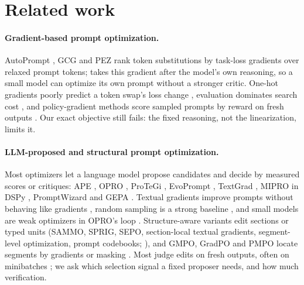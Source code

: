 \section{Related work}
\label{sec:related}

\paragraph{Gradient-based prompt optimization.} AutoPrompt \citep{shin2020autoprompt}, GCG
\citep{zou2023gcg} and PEZ \citep{wen2023hard} rank token substitutions by task-loss gradients
over relaxed prompt tokens; \greater{} \citep{das2025greater} takes this gradient after the model's
own reasoning, so a small model can optimize its own prompt without a stronger critic. One-hot
gradients poorly predict a token swap's loss change \citep{li2024fastergcg}, evaluation dominates
search cost \citep{zhao2024probe}, and policy-gradient methods score sampled prompts by reward on
fresh outputs \citep{deng2022rlprompt,diao2023bdpl}. Our exact objective still fails: the fixed
reasoning, not the linearization, limits it.

\paragraph{LLM-proposed and structural prompt optimization.} Most optimizers let a language model
propose candidates and decide by measured scores or critiques: APE \citep{zhou2023ape}, OPRO
\citep{yang2024opro}, ProTeGi \citep{pryzant2023protegi}, EvoPrompt \citep{guo2024evoprompt},
TextGrad \citep{yuksekgonul2025textgrad}, MIPRO in DSPy \citep{opsahl2024mipro,khattab2024dspy},
PromptWizard \citep{agarwal2025promptwizard} and GEPA \citep{agrawal2026gepa}. Textual gradients
improve prompts without behaving like gradients \citep{melcer2025textual}, random sampling is a
strong baseline \citep{lu2024strings}, and small models are weak optimizers in OPRO's loop
\citep{zhang2024revisiting}. Structure-aware variants edit sections or typed units (SAMMO, SPRIG,
SEPO, section-local textual gradients, segment-level optimization, prompt codebooks;
\citealp{schnabel2024sammo,zhang2024sprig,ma2026sepo,sharma2026mpo,kulin2026sapo,nath2026codebooks}),
and GMPO, GradPO and PMPO locate segments by gradients or masking
\citep{zhao2026gmpo,chakma2026gradpo,zhao2025pmpo}. Most judge edits on fresh outputs, often on
minibatches \citep{opsahl2024mipro,agrawal2026gepa}; we ask which selection signal a fixed proposer
needs, and how much verification.


